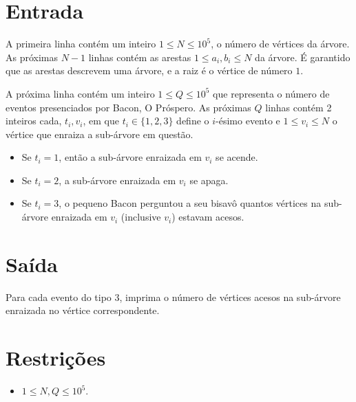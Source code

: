 %
%

\section*{Entrada}

A primeira linha contém um inteiro $1 \leq N \leq 10^5$, o número de vértices da árvore.
As próximas $N-1$ linhas contém as arestas $1 \leq a_i, b_i \leq N$ da árvore. É garantido que as arestas descrevem uma árvore, e a raiz é
o vértice de número $1$.

A próxima linha contém um inteiro $1 \leq Q \leq 10^5$ que representa o número de eventos presenciados por Bacon, O Próspero.
As próximas $Q$ linhas contém 2 inteiros cada, $t_i, v_i$, em que $t_i \in \{1, 2, 3\}$ define o $i$-ésimo evento e $1 \leq v_i \leq N$ o vértice que enraiza a sub-árvore em questão.
\begin{itemize}
\item Se $t_i = 1$, então a sub-árvore enraizada em $v_i$ se acende.
\item Se $t_i = 2$, a sub-árvore enraizada em $v_i$ se apaga.
\item Se $t_i = 3$, o pequeno Bacon perguntou a seu bisavô quantos vértices na sub-árvore enraizada em $v_i$ (inclusive $v_i$) estavam acesos.
\end{itemize}

%
%

\section*{Saída}

Para cada evento do tipo $3$, imprima o número de vértices acesos na sub-árvore enraizada no vértice correspondente.


\section*{Restrições}

\begin{itemize}
\item $1 \leq N, Q \leq 10^5$.
\end{itemize}

\exemplo
